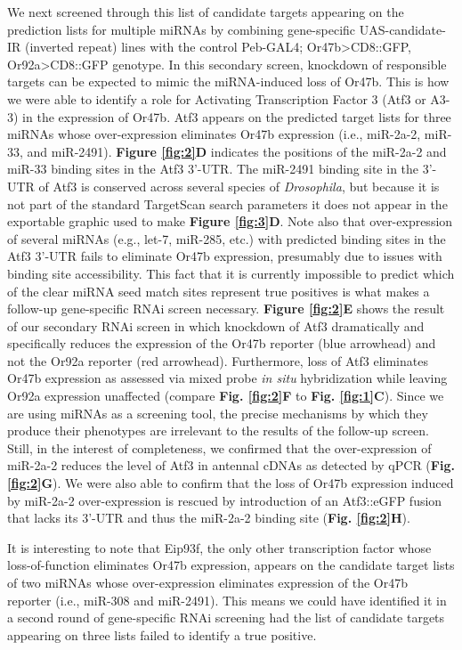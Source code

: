 We next screened through this list of candidate targets appearing on the prediction lists for multiple miRNAs by combining gene-specific UAS-candidate-IR (inverted repeat) lines with the control Peb-GAL4; Or47b\textgreater{}CD8::GFP, Or92a\textgreater{}CD8::GFP genotype.
In this secondary screen, knockdown of responsible targets can be expected to mimic the miRNA-induced loss of Or47b.
This is how we were able to identify a role for Activating Transcription Factor 3 (Atf3 or A3-3) in the expression of Or47b.
Atf3 appears on the predicted target lists for three miRNAs whose over-expression eliminates Or47b expression (i.e., miR-2a-2, miR-33, and miR-2491).
\textbf{Figure \ref{fig:2}D} indicates the positions of the miR-2a-2 and miR-33 binding sites in the Atf3 3'-UTR.
The miR-2491 binding site in the 3'-UTR of Atf3 is conserved across several species of \emph{Drosophila}, but because it is not part of the standard TargetScan search parameters it does not appear in the exportable graphic used to make \textbf{Figure \ref{fig:3}D}.
Note also that over-expression of several miRNAs (e.g., let-7, miR-285, etc.) with predicted binding sites in the Atf3 3'-UTR fails to eliminate Or47b expression, presumably due to issues with binding site accessibility.
This fact that it is currently impossible to predict which of the clear miRNA seed match sites represent true positives is what makes a follow-up gene-specific RNAi screen necessary.
\textbf{Figure \ref{fig:2}E} shows the result of our secondary RNAi screen in which knockdown of Atf3 dramatically and specifically reduces the expression of the Or47b reporter (blue arrowhead) and not the Or92a reporter (red arrowhead).
Furthermore, loss of Atf3 eliminates Or47b expression as assessed via mixed probe \emph{in situ} hybridization while leaving Or92a expression unaffected (compare \textbf{Fig. \ref{fig:2}F} to \textbf{Fig. \ref{fig:1}C}).
Since we are using miRNAs as a screening tool, the precise mechanisms by which they produce their phenotypes are irrelevant to the results of the follow-up screen.
Still, in the interest of completeness, we confirmed that the over-expression of miR-2a-2 reduces the level of Atf3 in antennal cDNAs as detected by qPCR (\textbf{Fig. \ref{fig:2}G}).
We were also able to confirm that the loss of Or47b expression induced by miR-2a-2 over-expression is rescued by introduction of an Atf3::eGFP fusion that lacks its 3'-UTR and thus the miR-2a-2 binding site (\textbf{Fig. \ref{fig:2}H}).

It is interesting to note that Eip93f, the only other transcription factor whose loss-of-function eliminates Or47b expression, appears on the candidate target lists of two miRNAs whose over-expression eliminates expression of the Or47b reporter (i.e., miR-308 and miR-2491).
This means we could have identified it in a second round of gene-specific RNAi screening had the list of candidate targets appearing on three lists failed to identify a true positive.
